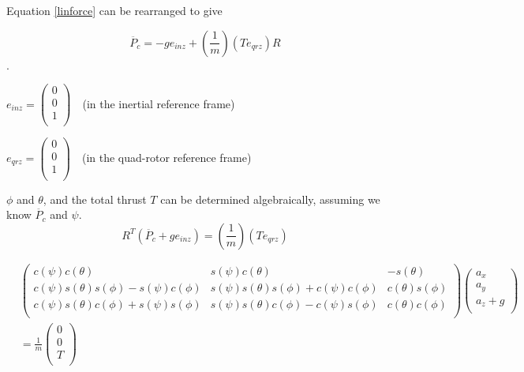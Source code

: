 Equation \ref{linforce} can be rearranged to give


\begin{equation}
    \label{eq:acc_from_model}
    \ddot{P_c} = - g e_{inz} + (\frac{1}{m}) (T e_{qrz}) R 
\end{equation}.


$ e_{inz} = \left( \begin{array}{c}
0\\0\\1\\
\end{array}\right) \text{  }$ (in the inertial reference frame)

$ e_{qrz} = \left( \begin{array}{c}
0\\0\\1\\
\end{array}\right) \text{  }$  (in the quad-rotor reference frame)

$\phi$ and $\theta$, and the total thrust $T$ can be determined algebraically, assuming we know $\ddot{P_c}$ and $\psi$.\\

\begin{equation}
    \label{eq:thrustTransformation}
    R^T ( \ddot{P_c} + g e_{inz}) = (\frac{1}{m}) (T e_{qrz})
\end{equation}


\begin{equation}
\begin{split}
    &\left( \begin{array}{ccc}
        c(\psi) c(\theta) & s(\psi) c(\theta) & -s(\theta)\\
        c(\psi) s(\theta) s(\phi) - s(\psi) c(\phi) & s(\psi) s(\theta) s(\phi) + c(\psi) c(\phi) & c(\theta) s(\phi)\\
        c(\psi) s(\theta) c(\phi) + s(\psi) s(\phi) & s(\psi) s(\theta) c(\phi) - c(\psi) s(\phi) & c(\theta) c(\phi)\\
    \end{array} \right)\left( \begin{array}{c} a_x\\a_y\\a_z+g\\\end{array} \right)\\
    &= \frac{1}{m} \left( \begin{array}{c} 0\\0\\T\\ \end{array} \right) 
\end{split}
\end{equation}

